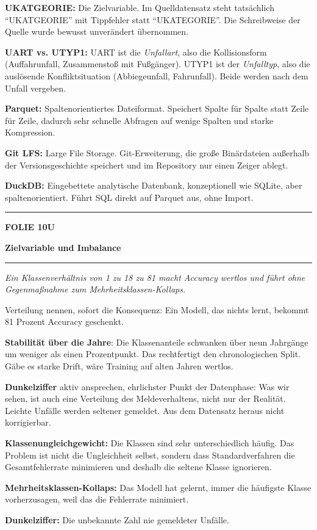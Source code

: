 \documentclass[9pt]{extarticle}
\newcommand{\karte}[3]{%
  \clearpage
  {\color{Accent}\rule{\linewidth}{2.4pt}}\par\vspace{2.5pt}
  {\fontsize{8}{9}\selectfont\bfseries\color{Accent}%
   FOLIE #1\hspace{1.2em}\textbar\hspace{1.2em}#2}\par\vspace{1pt}
  {\fontsize{16}{18}\selectfont\bfseries\color{AccentDark}#3}\par\vspace{3pt}
  {\color{Accent!45}\rule{\linewidth}{0.5pt}}\par\vspace{4pt}%
}
\newcommand{\rubrik}[1]{%
  \vspace{3.5pt}{\fontsize{7.5}{8.5}\selectfont\bfseries\color{Grau}%
  \MakeUppercase{#1}}\par\vspace{1.5pt}}
\newcommand{\kernsatz}[1]{%
  \begin{tcolorbox}[enhanced,sharp corners,boxrule=0pt,
    leftrule=2.2pt,colframe=Accent,colback=AccentPale,
    left=5pt,right=5pt,top=3.5pt,bottom=3.5pt,before skip=1pt,after skip=2pt]
    \color{AccentDark}\itshape #1
  \end{tcolorbox}}
\newcommand{\bg}[2]{\item \textbf{#1:} #2}
\begin{document}
\rubrik{Begriffe}
\begin{begriff}
  \bg{UKATGEORIE}{Die Zielvariable. Im Quelldatensatz steht tatsächlich \enquote{UKATGEORIE}
      mit Tippfehler statt \enquote{UKATEGORIE}. Die Schreibweise der Quelle wurde bewusst
      unverändert übernommen.}
  \bg{UART vs. UTYP1}{UART ist die \textit{Unfallart}, also die Kollisionsform (Auffahrunfall,
      Zusammenstoß mit Fußgänger). UTYP1 ist der \textit{Unfalltyp}, also die auslösende
      Konfliktsituation (Abbiegeunfall, Fahrunfall). Beide werden nach dem Unfall vergeben.}
  \bg{Parquet}{Spaltenorientiertes Dateiformat. Speichert Spalte für Spalte statt Zeile für
      Zeile, dadurch sehr schnelle Abfragen auf wenige Spalten und starke Kompression.}
  \bg{Git LFS}{Large File Storage. Git-Erweiterung, die große Binärdateien außerhalb der
      Versionsgeschichte speichert und im Repository nur einen Zeiger ablegt.}
  \bg{DuckDB}{Eingebettete analytische Datenbank, konzeptionell wie SQLite, aber
      spaltenorientiert. Führt SQL direkt auf Parquet aus, ohne Import.}
\end{begriff}

\karte{10}{U}{Zielvariable und Imbalance}

\kernsatz{Ein Klassenverhältnis von 1 zu 18 zu 81 macht Accuracy wertlos und führt ohne
Gegenmaßnahme zum Mehrheitsklassen-Kollaps.}

\rubrik{Sagen}
\begin{sag}
  \item Verteilung nennen, sofort die Konsequenz: Ein Modell, das nichts lernt, bekommt
        81 Prozent Accuracy geschenkt.
  \item \textbf{Stabilität über die Jahre}: Die Klassenanteile schwanken über neun Jahrgänge
        um weniger als einen Prozentpunkt. Das rechtfertigt den chronologischen Split. Gäbe es
        starke Drift, wäre Training auf alten Jahren wertlos.
  \item \textbf{Dunkelziffer} aktiv ansprechen, ehrlichster Punkt der Datenphase: Was wir sehen,
        ist auch eine Verteilung des Meldeverhaltens, nicht nur der Realität. Leichte Unfälle
        werden seltener gemeldet. Aus dem Datensatz heraus nicht korrigierbar.
\end{sag}

\rubrik{Begriffe}
\begin{begriff}
  \bg{Klassenungleichgewicht}{Die Klassen sind sehr unterschiedlich häufig. Das Problem ist
      nicht die Ungleichheit selbst, sondern dass Standardverfahren die Gesamtfehlerrate
      minimieren und deshalb die seltene Klasse ignorieren.}
  \bg{Mehrheitsklassen-Kollaps}{Das Modell hat gelernt, immer die häufigste Klasse
      vorherzusagen, weil das die Fehlerrate minimiert.}
  \bg{Dunkelziffer}{Die unbekannte Zahl nie gemeldeter Unfälle.}
\end{begriff}
\end{document}
